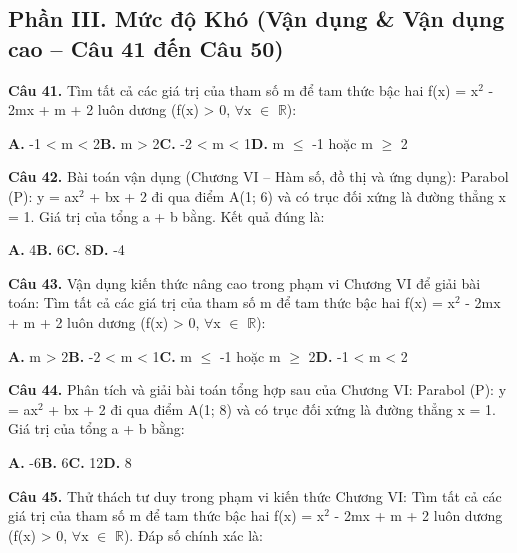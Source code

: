 \documentclass[11pt,a4paper]{article}
\begin{document}
\subsection*{\color{accent} Phần III. Mức độ Khó (Vận dụng \& Vận dụng cao -- Câu 41 đến Câu 50)}
\textbf{\color{primary} Câu 41.} Tìm tất cả các giá trị của tham số m để tam thức bậc hai f(x) = x$^2$ - 2mx + m + 2 luôn dương (f(x) > 0, $\forall$x $\in$ $\mathbb{R}$):\par
\hspace*{1.5em}\textbf{A.} -1 < m < 2\quad\quad \textbf{B.} m > 2\quad\quad \textbf{C.} -2 < m < 1\quad\quad \textbf{D.} m $\le$ -1 hoặc m $\ge$ 2\par\vspace{2pt}
\textbf{\color{primary} Câu 42.} Bài toán vận dụng (Chương VI – Hàm số, đồ thị và ứng dụng): Parabol (P): y = ax$^2$ + bx + 2 đi qua điểm A(1; 6) và có trục đối xứng là đường thẳng x = 1. Giá trị của tổng a + b bằng. Kết quả đúng là:\par
\hspace*{1.5em}\textbf{A.} 4\quad\quad \textbf{B.} 6\quad\quad \textbf{C.} 8\quad\quad \textbf{D.} -4\par\vspace{2pt}
\textbf{\color{primary} Câu 43.} Vận dụng kiến thức nâng cao trong phạm vi Chương VI để giải bài toán: Tìm tất cả các giá trị của tham số m để tam thức bậc hai f(x) = x$^2$ - 2mx + m + 2 luôn dương (f(x) > 0, $\forall$x $\in$ $\mathbb{R}$):\par
\hspace*{1.5em}\textbf{A.} m > 2\quad\quad \textbf{B.} -2 < m < 1\quad\quad \textbf{C.} m $\le$ -1 hoặc m $\ge$ 2\quad\quad \textbf{D.} -1 < m < 2\par\vspace{2pt}
\textbf{\color{primary} Câu 44.} Phân tích và giải bài toán tổng hợp sau của Chương VI: Parabol (P): y = ax$^2$ + bx + 2 đi qua điểm A(1; 8) và có trục đối xứng là đường thẳng x = 1. Giá trị của tổng a + b bằng:\par
\hspace*{1.5em}\textbf{A.} -6\quad\quad \textbf{B.} 6\quad\quad \textbf{C.} 12\quad\quad \textbf{D.} 8\par\vspace{2pt}
\textbf{\color{primary} Câu 45.} Thử thách tư duy trong phạm vi kiến thức Chương VI: Tìm tất cả các giá trị của tham số m để tam thức bậc hai f(x) = x$^2$ - 2mx + m + 2 luôn dương (f(x) > 0, $\forall$x $\in$ $\mathbb{R}$). Đáp số chính xác là:\par
\end{document}
